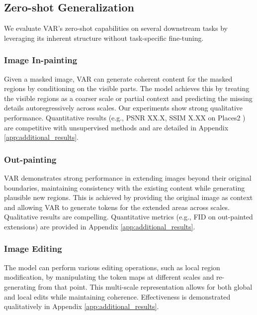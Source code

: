 \documentclass{article}
\begin{document}
\subsection{Zero-shot Generalization}
\label{ssec:zero_shot}

We evaluate VAR's zero-shot capabilities on several downstream tasks by leveraging its inherent structure without task-specific fine-tuning.

\subsubsection{Image In-painting}
Given a masked image, VAR can generate coherent content for the masked regions by conditioning on the visible parts. The model achieves this by treating the visible regions as a coarser scale or partial context and predicting the missing details autoregressively across scales.
Our experiments show strong qualitative performance. Quantitative results (e.g., PSNR XX.X, SSIM X.XX on Places2 \cite{zhou2017places}) are competitive with unsupervised methods and are detailed in Appendix \ref{app:additional_results}.

\subsubsection{Out-painting}
VAR demonstrates strong performance in extending images beyond their original boundaries, maintaining consistency with the existing content while generating plausible new regions. This is achieved by providing the original image as context and allowing VAR to generate tokens for the extended areas across scales.
Qualitative results are compelling. Quantitative metrics (e.g., FID on out-painted extensions) are provided in Appendix \ref{app:additional_results}.

\subsubsection{Image Editing}
The model can perform various editing operations, such as local region modification, by manipulating the token maps at different scales and re-generating from that point. This multi-scale representation allows for both global and local edits while maintaining coherence.
Effectiveness is demonstrated qualitatively in Appendix \ref{app:additional_results}.
\end{document}
